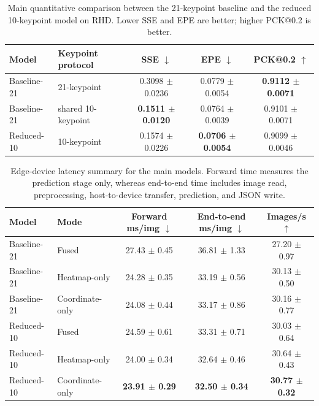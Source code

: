 \documentclass[10pt,letterpaper]{article}
\begin{document}
\begin{table}[H]
\centering
\footnotesize
\caption{Main quantitative comparison between the 21-keypoint baseline and the reduced 10-keypoint model on RHD. Lower SSE and EPE are better; higher PCK@0.2 is better.}
\label{tab:main_accuracy}
\begin{tabular}{llccc}
\toprule
Model & Keypoint protocol & SSE $\downarrow$ & EPE $\downarrow$ & PCK@0.2 $\uparrow$ \\
\midrule
Baseline-21 & 21-keypoint & 0.3098 $\pm$ 0.0236 & 0.0779 $\pm$ 0.0054 & \textbf{0.9112 $\pm$ 0.0071} \\
Baseline-21 & shared 10-keypoint & \textbf{0.1511 $\pm$ 0.0120} & 0.0764 $\pm$ 0.0039 & 0.9101 $\pm$ 0.0071 \\
Reduced-10 & 10-keypoint & 0.1574 $\pm$ 0.0226 & \textbf{0.0706 $\pm$ 0.0054} & 0.9099 $\pm$ 0.0046 \\
\bottomrule
\end{tabular}
\end{table}

\begin{table}[H]
\centering
\footnotesize
\caption{Edge-device latency summary for the main models. Forward time measures the prediction stage only, whereas end-to-end time includes image read, preprocessing, host-to-device transfer, prediction, and JSON write.}
\label{tab:latency}
\begin{tabular}{llccc}
\toprule
Model & Mode & Forward ms/img $\downarrow$ & End-to-end ms/img $\downarrow$ & Images/s $\uparrow$ \\
\midrule
Baseline-21 & Fused & 27.43 $\pm$ 0.45 & 36.81 $\pm$ 1.33 & 27.20 $\pm$ 0.97 \\
Baseline-21 & Heatmap-only & 24.28 $\pm$ 0.35 & 33.19 $\pm$ 0.56 & 30.13 $\pm$ 0.50 \\
Baseline-21 & Coordinate-only & 24.08 $\pm$ 0.44 & 33.17 $\pm$ 0.86 & 30.16 $\pm$ 0.77 \\
Reduced-10 & Fused & 24.59 $\pm$ 0.61 & 33.31 $\pm$ 0.71 & 30.03 $\pm$ 0.64 \\
Reduced-10 & Heatmap-only & 24.00 $\pm$ 0.34 & 32.64 $\pm$ 0.46 & 30.64 $\pm$ 0.43 \\
Reduced-10 & Coordinate-only & \textbf{23.91 $\pm$ 0.29} & \textbf{32.50 $\pm$ 0.34} & \textbf{30.77 $\pm$ 0.32} \\
\bottomrule
\end{tabular}
\end{table}
\end{document}
